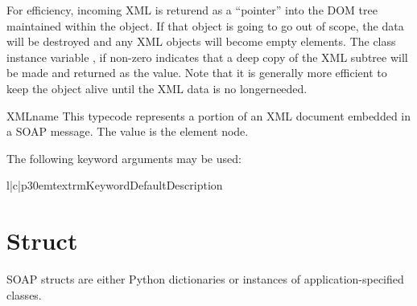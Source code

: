 For efficiency, incoming XML is returend as a ``pointer'' into the
DOM tree maintained within the  object.
If that object is going to go out of scope, the data will be destroyed
and any XML objects will become empty elements.
The class instance variable , if non-zero indicates that a
deep copy of the XML subtree will be made and returned as the value.
Note that it is generally more efficient to keep the 
object alive until the XML data is no longerneeded.

\begin{classdesc}{XML}{name}
This typecode represents a portion of an XML document embedded in a SOAP
message.
The value is the element node.

The following keyword arguments may be used:

\begin{tableiii}{l|c|p{30em}}{textrm}{Keyword}{Default}{Description}
\end{tableiii}
\end{classdesc}

\section{Struct}

SOAP structs are either Python dictionaries or
instances of application-specified classes.

